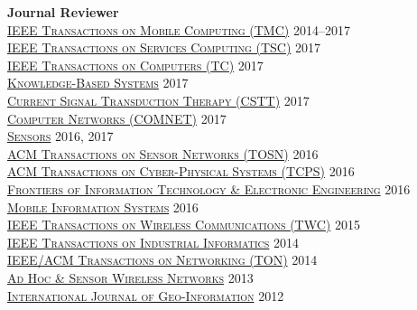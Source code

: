{\bf Journal Reviewer}\\
{\href{https://www.computer.org/portal/web/tmc}{\textsc{IEEE Transactions on Mobile Computing (TMC)}}} \hfill 2014--2017\\
{\href{https://www.computer.org/web/tsc}{\textsc{IEEE Transactions on Services Computing (TSC)}}} \hfill 2017\\
{\href{https://www.computer.org/web/tc}{\textsc{IEEE Transactions on Computers (TC)}}} \hfill 2017\\
{\href{https://www.journals.elsevier.com/knowledge-based-systems}{\textsc{Knowledge-Based Systems}}} \hfill 2017\\
{\href{http://benthamscience.com/journals/current-signal-transduction-therapy/}{\textsc{Current Signal Transduction Therapy (CSTT)}}} \hfill 2017\\
{\href{http://ees.elsevier.com/comnet/}{\textsc{Computer Networks (COMNET)}}} \hfill 2017\\
{\href{http://www.mdpi.com/journal/sensors}{\textsc{Sensors}}} \hfill 2016, 2017\\
{\href{http://tosn.acm.org/}{\textsc{ACM Transactions on Sensor Networks (TOSN)}}} \hfill 2016\\
{\href{http://tcps.acm.org/}{\textsc{ACM Transactions on Cyber-Physical Systems (TCPS)}}} \hfill 2016\\
{\href{http://www.springer.com/computer/journal/11714}{\textsc{Frontiers of Information Technology \& Electronic Engineering}}} \hfill 2016\\
{\href{https://www.hindawi.com/journals/misy/}{\textsc{Mobile Information Systems}}} \hfill 2016\\
{\href{http://www.comsoc.org/twc}{\textsc{IEEE Transactions on Wireless Communications (TWC)}}} \hfill 2015\\
{\href{http://tii.ieee-ies.org}{\textsc{IEEE Transactions on Industrial Informatics}}} \hfill 2014\\
{\href{http://www.ifp.illinois.edu/ton}{\textsc{IEEE/ACM Transactions on Networking (TON)}}} \hfill 2014\\
{\href{http://www.oldcitypublishing.com/AHSWN/AHSWN.html}{\textsc{Ad Hoc \& Sensor Wireless Networks}}} \hfill 2013\\
{\href{http://www.mdpi.com/journal/ijgi}{\textsc{International Journal of Geo-Information}}} \hfill 2012\\
